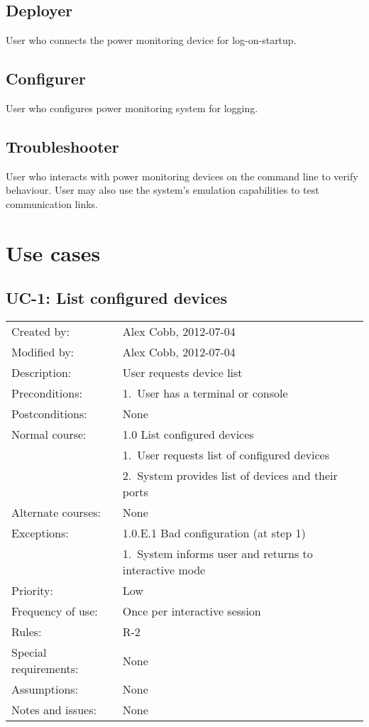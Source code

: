 \documentclass[pdftex,oneside,12pt,a4paper]{book}
\begin{document}
\subsection{Deployer}
User who connects the power monitoring device for log-on-startup.

\subsection{Configurer}
User who configures power monitoring system for logging.

\subsection{Troubleshooter}
User who interacts with power monitoring devices on the command line to verify behaviour.  User may also use the system's emulation capabilities to test communication links.

\section{Use cases}
\subsection{UC-1: List configured devices}
\begin{tabular}{|l|p{10cm}|}\hline
Created by: & Alex Cobb, 2012-07-04 \\
Modified by: & Alex Cobb, 2012-07-04 \\\hline
Description: & User requests device list \\\hline
Preconditions: & 1.\ User has a terminal or console \\\hline
Postconditions: & None \\\hline
Normal course: & 1.0 List configured devices\\
 & 1.\ User requests list of configured devices \\
 & 2.\ System provides list of devices and their ports\\\hline
Alternate courses: & None \\\hline
Exceptions: & 1.0.E.1 Bad configuration (at step 1) \\
 & 1.\  System informs user and returns to interactive mode\\\hline
Priority: & Low \\\hline
Frequency of use: & Once per interactive session \\\hline
Rules: & R-2 \\\hline
Special requirements: & None\\\hline
Assumptions: & None\\\hline
Notes and issues: & None\\\hline
\end{tabular}
\end{document}
